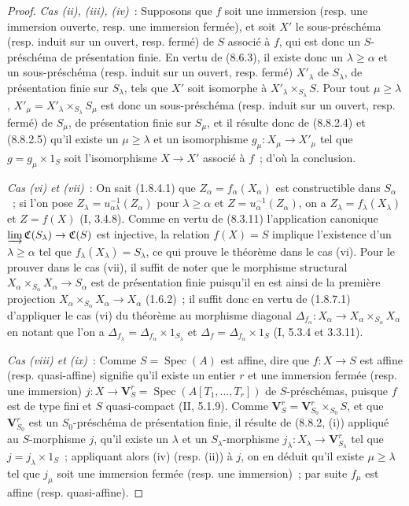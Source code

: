 \begin{proof}
\emph{Cas (ii), (iii), (iv)}~: Supposons que $f$ soit une immersion (resp.
une immersion ouverte, resp. une immersion fermée), et soit $X'$ le
sous-préschéma (resp. induit sur un ouvert, resp. fermé) de $S$ associé à $f$,
qui est donc un $S$-préschéma de présentation finie.
En vertu de (8.6.3), il existe donc un $\lambda\geq\alpha$ et un
sous-préschéma (resp. induit sur un ouvert, resp. fermé) $X'_\lambda$ de
$S_\lambda$, de présentation finie sur $S_\lambda$, tels que $X'$ soit
isomorphe à $X'_\lambda\times_{S_\lambda}S$. Pour tout $\mu\geq\lambda$,
$X'_\mu=X'_\lambda\times_{S_\lambda}S_\mu$ est donc un sous-préschéma (resp.
induit sur un ouvert, resp. fermé) de $S_\mu$, de présentation finie sur
$S_\mu$, et il résulte donc de (8.8.2.4) et (8.8.2.5) qu'il existe un
$\mu\geq\lambda$ et un isomorphisme $g_\mu:X_\mu\to X'_\mu$ tel que
$g=g_\mu\times1_S$ soit l'isomorphisme $X\to X'$ associé à $f$~; d'où la
conclusion.

\emph{Cas (vi) et (vii)}~: On sait (1.8.4.1) que
$Z_\alpha=f_\alpha(X_\alpha)$ est constructible dans $S_\alpha$~; si l'on
pose $Z_\lambda=u_{\alpha\lambda}^{-1}(Z_\alpha)$ pour $\lambda\geq\alpha$
et $Z=u_\alpha^{-1}(Z_\alpha)$, on a $Z_\lambda=f_\lambda(X_\lambda)$ et
$Z=f(X)$ (I, 3.4.8). Comme en vertu de (8.3.11) l'application canonique
$\varinjlim\mathfrak C(S_\lambda)\to\mathfrak C(S)$ est injective, la
relation $f(X)=S$ implique l'existence d'un $\lambda\geq\alpha$ tel que
$f_\lambda(X_\lambda)=S_\lambda$, ce qui prouve le théorème dans le cas (vi).
Pour le prouver dans le cas (vii), il suffit de noter que le morphisme
structural $X_\alpha\times_{S_\alpha}X_\alpha\to S_\alpha$ est de présentation
finie puisqu'il en est ainsi de la première projection
$X_\alpha\times_{S_\alpha}X_\alpha\to X_\alpha$ (1.6.2)~; il suffit donc en
vertu de (1.8.7.1) d'appliquer le cas (vi) du théorème au morphisme diagonal
$\Delta_{f_\alpha}:X_\alpha\to X_\alpha\times_{S_\alpha}X_\alpha$ en notant
que l'on a $\Delta_{f_\lambda}=\Delta_{f_\alpha}\times1_{S_\lambda}$ et
$\Delta_f=\Delta_{f_\alpha}\times1_S$ (I, 5.3.4 et 3.3.11).

\emph{Cas (viii) et (ix)}~: Comme $S=\operatorname{Spec}(A)$ est affine, dire
que $f:X\to S$ est affine (resp. quasi-affine) signifie qu'il existe un entier
$r$ et une immersion fermée (resp. une immersion)
$j:X\to\mathbf V_S^r=\operatorname{Spec}(A[T_1,\ldots,T_r])$ de
$S$-préschémas, puisque $f$ est de type fini et $S$ quasi-compact
(II, 5.1.9). Comme
$\mathbf V_S^r=\mathbf V_{S_0}^r\times_{S_0}S$, et que
$\mathbf V_{S_0}^r$ est un $S_0$-préschéma de présentation finie, il résulte
de (8.8.2, (i)) appliqué au $S$-morphisme $j$, qu'il existe un $\lambda$ et un
$S_\lambda$-morphisme $j_\lambda:X_\lambda\to\mathbf V_{S_\lambda}^r$ tel que
$j=j_\lambda\times1_S$~; appliquant alors (iv) (resp. (ii)) à $j$, on en
déduit qu'il existe $\mu\geq\lambda$ tel que $j_\mu$ soit une immersion
fermée (resp. une immersion)~; par suite $f_\mu$ est affine (resp.
quasi-affine).


\end{proof}
